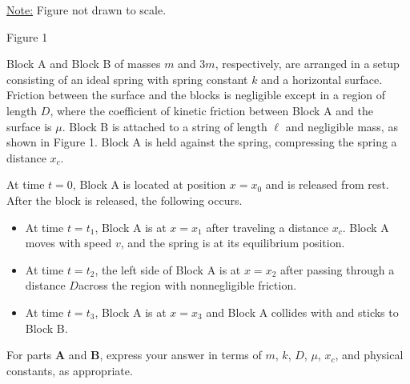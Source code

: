 \documentclass[12pt]{../../oss-apphys-exam}
\begin{document}
\begin{center}
        
  \underline{Note:} Figure not drawn to scale.
        
  Figure 1
\end{center}

\begin{questions} 
  \question Block A and Block B of masses $m$ and $3m$, respectively, are
  arranged in a setup consisting of an ideal spring with spring constant $k$
  and a horizontal surface. Friction between the surface and the blocks is
  negligible except in a region of length $D$, where the coefficient of kinetic
  friction between Block A and the surface is $\mu$. Block B is attached to a
  string of length $\ell$ and negligible mass, as shown in Figure 1. Block A
  is held against the spring, compressing the spring a distance $x_c$.

  \vspace{.2in}At time $t=0$, Block A is located at position $x = x_0$ and is
  released from rest. After the block is released, the following occurs.

  \begin{itemize}[itemsep=6pt]  
  \item At time $t=t_1$, Block A is at $x=x_1$ after traveling a distance
    $x_c$. Block A moves with speed $v$, and the spring is at its equilibrium
    position.

  \item At time $t=t_2$, the left side of Block A is at $x=x_2$ after passing
    through a distance $D$across the region with nonnegligible friction.

  \item At time $t=t_3$, Block A is at $x=x_3$ and Block A collides with and
    sticks to Block B.
  \end{itemize}

  For parts \textbf{A} and \textbf{B}, express your answer in terms
  of $m$, $k$, $D$, $\mu$, $x_c$, and physical constants, as appropriate.
\end{questions}
\end{document}

